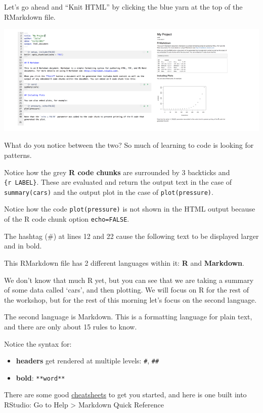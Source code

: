 \documentclass[]{book}
\providecommand{\tightlist}{%
  \setlength{\itemsep}{0pt}\setlength{\parskip}{0pt}}
\begin{document}
Let's go ahead and ``Knit HTML'' by clicking the blue yarn at the top of the RMarkdown file.

\includegraphics[width=0.8\linewidth]{img/rmarkdown_side_by_side}

What do you notice between the two? So much of learning to code is looking for patterns.

Notice how the grey \textbf{R code chunks} are surrounded by 3 backticks and \texttt{\{r\ LABEL\}}. These are evaluated and return the output text in the case of \texttt{summary(cars)} and the output plot in the case of \texttt{plot(pressure)}.

Notice how the code \texttt{plot(pressure)} is not shown in the HTML output because of the R code chunk option \texttt{echo=FALSE}.

The hashtag (\#) at lines 12 and 22 cause the following text to be displayed larger and in bold.

This RMarkdown file has 2 different languages within it: \textbf{R} and \textbf{Markdown}.

We don't know that much R yet, but you can see that we are taking a summary of some data called `cars', and then plotting. We will focus on R for the rest of the workshop, but for the rest of this morning let's focus on the second language.

The second language is Markdown. This is a formatting language for plain text, and there are only about 15 rules to know.

Notice the syntax for:

\begin{itemize}
\tightlist
\item
  \textbf{headers} get rendered at multiple levels: \texttt{\#}, \texttt{\#\#}
\item
  \textbf{bold}: \texttt{**word**}
\end{itemize}

There are some good \href{https://github.com/adam-p/markdown-here/wiki/Markdown-Here-Cheatsheet}{cheatsheets} to get you started, and here is one built into RStudio: Go to Help \textgreater{} Markdown Quick Reference
\end{document}
